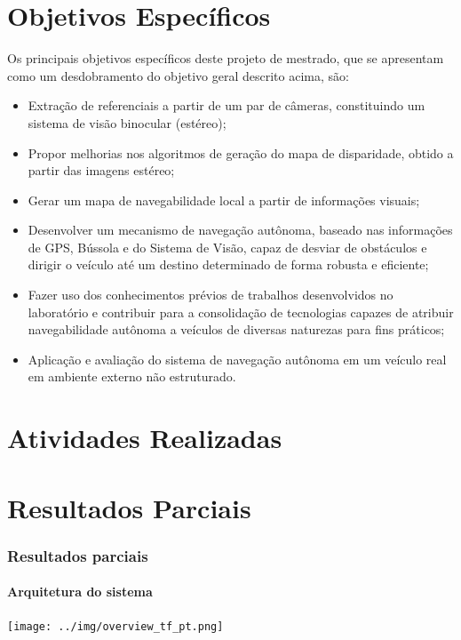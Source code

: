 \documentclass{article}
\begin{document}
\section{Objetivos Específicos}

Os principais objetivos específicos deste projeto de mestrado, que se apresentam
como um desdobramento do objetivo geral descrito acima, são:

\begin{itemize}

\item Extração de referenciais a partir de um par de câmeras, constituindo um
sistema de visão binocular (estéreo);

\item Propor melhorias nos algoritmos de geração do mapa de disparidade, obtido
a partir das imagens estéreo;

\item Gerar um mapa de navegabilidade local a partir de informações visuais;

\item Desenvolver um mecanismo de navegação autônoma, baseado nas informações de
GPS, Bússola e do Sistema de Visão, capaz de desviar de obstáculos e dirigir o
veículo até um destino determinado de forma robusta e eficiente;

\item Fazer uso dos conhecimentos prévios de trabalhos desenvolvidos no
laboratório e contribuir para a consolidação de tecnologias capazes de atribuir
navegabilidade autônoma a veículos de diversas naturezas para fins práticos;

\item Aplicação e avaliação do sistema de navegação autônoma em um veículo real
em ambiente externo não estruturado.

\end{itemize}


\section{Atividades Realizadas}



\section{Resultados Parciais}

\begin{frame}
\frametitle{Resultados parciais}
\framesubtitle{Arquitetura do sistema}
\texttt{[image: ../img/overview\_tf\_pt.png]}
\end{frame}
\end{document}
